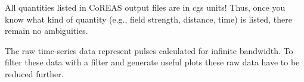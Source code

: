 \documentclass[a4paper,10pt]{article}
\begin{document}
All quantities listed in CoREAS output files are in cgs units! Thus, once you know what kind of quantity (e.g., field strength, distance, time) is listed, there remain no ambiguities.

The raw time-series data represent pulses calculated for infinite bandwidth. To filter these data with a filter and generate useful plots these raw data have to be reduced further.




%
%
%
%


\end{document}
